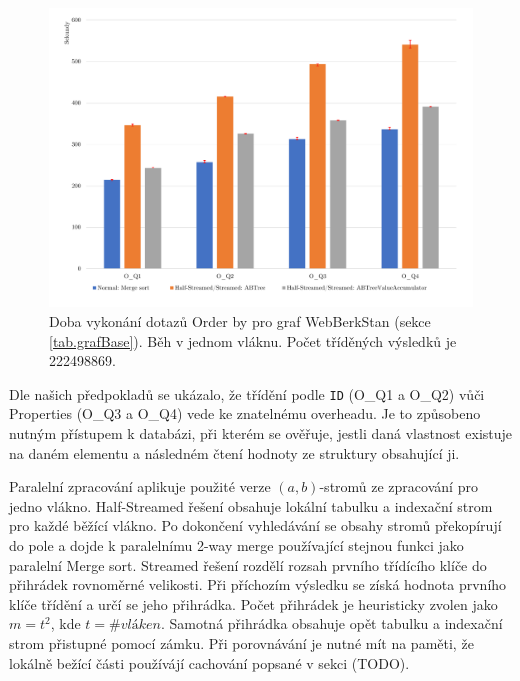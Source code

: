 \begin{figure}[!htp]
\includegraphics[width=\linewidth]{../img/webberkstanOrderByST.pdf}\centering
\caption{Doba vykonání dotazů Order by pro graf WebBerkStan (sekce \ref{tab.grafBase}). Běh v jednom vláknu. Počet tříděných výsledků je 222498869.}
\label{figure.webberkstanOrderST}
\end{figure}

\clearpage

Dle našich předpokladů se ukázalo, že třídění podle \verb+ID+ (O\_Q1 a O\_Q2) vůči Properties (O\_Q3 a O\_Q4) vede ke znatelnému overheadu.
Je to způsobeno nutným přístupem k databázi, při kterém se ověřuje, jestli daná vlastnost existuje na daném elementu a následném čtení hodnoty ze struktury obsahující ji.

Paralelní zpracování aplikuje použité verze $(a, b)$-stromů ze zpracování pro jedno vlákno. 
Half-Streamed řešení obsahuje lokální tabulku a indexační strom pro každé běžící vlákno. 
Po dokončení vyhledávání se obsahy stromů překopírují do pole a dojde k paralelnímu 2-way merge používající stejnou funkci jako paralelní Merge sort. 
Streamed řešení rozdělí rozsah prvního třídícího klíče do přihrádek rovnoměrné velikosti. 
Při příchozím výsledku se získá hodnota prvního klíče třídění a určí se jeho přihrádka. 
Počet přihrádek je heuristicky zvolen jako $m=t^2$, kde $t=\#vláken$. 
Samotná přihrádka obsahuje opět tabulku a indexační strom přistupné pomocí zámku. 
Při porovnávání je nutné mít na paměti, že lokálně bežící části používájí cachování popsané v sekci (TODO).  

